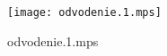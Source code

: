 \documentclass[letterpaper,10pt]{article}
\begin{document}
\begin{figure}
    \centering
    \texttt{[image: odvodenie.1.mps]}
    \caption{odvodenie.1.mps}
\end{figure}
\end{document}
